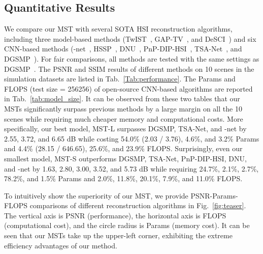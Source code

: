 \documentclass[10pt,twocolumn,letterpaper]{article}
\begin{document}
\subsection{Quantitative Results}
\vspace{-0.5mm}
We compare our MST with several SOTA HSI reconstruction algorithms, including three model-based methods (TwIST~\cite{twist}, GAP-TV~\cite{gap_tv}, and DeSCI~\cite{desci}) and six CNN-based methods (-net~\cite{lambda}, HSSP~\cite{hssp}, DNU~\cite{dnu}, PnP-DIP-HSI~\cite{self}, TSA-Net~\cite{tsa_net}, and DGSMP~\cite{gsm}). For fair comparisons, all methods are tested with the same settings as DGSMP~\cite{gsm}. The PSNR and SSIM results of different methods  on 10 scenes in the simulation datasets are listed in Tab.~\ref{Tab:performance}. The Params and FLOPS (test size = 256256) of open-source CNN-based algorithms are reported in Tab.~\ref{tab:model_size}. It can be observed from these two tables that our MSTs significantly surpass previous methods by a large margin on all the 10 scenes while requiring much cheaper memory and computational costs. More specifically, our best model, MST-L surpasses DGSMP, TSA-Net, and -net by 2.55, 3.72, and 6.65 dB while costing 54.0\% (2.03 / 3.76), 4.6\%, and 3.2\% Params and 4.4\% (28.15 / 646.65), 25.6\%, and 23.9\% FLOPS. Surprisingly, even our smallest model, MST-S outperforms DGSMP, TSA-Net, PnP-DIP-HSI, DNU, and -net by 1.63, 2.80, 3.00, 3.52, and 5.73 dB while requiring 24.7\%, 2.1\%, 2.7\%, 78.2\%, and 1.5\% Params and 2.0\%, 11.8\%, 20.1\%, 7.9\%, and 11.0\% FLOPS. 

To intuitively show the superiority of our MST, we provide PSNR-Params-FLOPS comparisons of different reconstruction algorithms in Fig.~\ref{fig:teaser}. The vertical axis is PSNR (performance), the horizontal axis is FLOPS (computational cost), and the circle radius is Params (memory cost). It can be seen that our MSTs take up the upper-left corner, exhibiting the extreme efficiency advantages of our method.



\vspace{-1.8mm}
\end{document}
